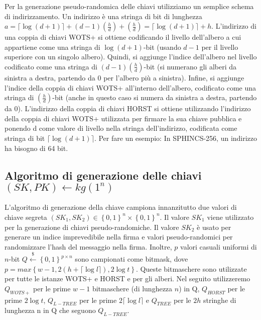 Per la generazione pseudo-randomica delle chiavi utilizziamo un semplice schema di indirizzamento. Un indirizzo è una stringa di bit di lunghezza \(a = \lceil \log(d + 1)\rceil + (d - 1)(\frac{h}{d}) + (\frac{h}{d}) = \lceil \log(d + 1)\rceil + h\). L'indirizzo di una coppia di chiavi WOTS+ si ottiene codificando il livello dell'albero a cui appartiene come una stringa di \(\log(d+1)\)-bit (usando \(d-1\) per il livello superiore con un singolo albero). Quindi, si aggiunge l'indice dell'albero nel livello codificato come una stringa di \((d - 1)(\frac{h}{d})\)-bit (si numerano gli alberi da sinistra a destra, partendo da 0 per l'albero più a sinistra). Infine, si aggiunge l'indice della coppia di chiavi WOTS+ all'interno dell'albero, codificato come una stringa di \((\frac{h}{d})\)-bit (anche in questo caso si numera da sinistra a destra, partendo da 0). L'indirizzo della coppia di chiavi HORST si ottiene utilizzando l'indirizzo della coppia di chiavi WOTS+ utilizzata per firmare la sua chiave pubblica e ponendo d come valore di livello nella stringa dell'indirizzo, codificata come stringa di bit \(\lceil \log(d + 1) \rceil\). Per fare un esempio: In SPHINCS-256, un indirizzo ha bisogno di 64 bit.

\subsection{Algoritmo di generazione delle chiavi\\\((SK, PK) \leftarrow kg(1^n)\)}
\label{sec:key_generation}
L'algoritmo di generazione della chiave campiona innanzitutto due valori di chiave segreta \( (SK_1, SK_2) \in \left\{0,1\right\}^n \times \left\{0,1\right\}^n \). Il valore \(SK_1\) viene utilizzato per la generazione di chiavi pseudo-randomiche. Il valore \(SK_2\) è usato per generare un indice imprevedibile nella firma e valori pseudo-randomici per randomizzare l'hash del messaggio nella firma. Inoltre, \(p\) valori casuali uniformi di \(n\)-bit \(Q \overset{\$}{\leftarrow} \left\{0, 1\right\}^{p \times n}\) sono campionati come bitmask, dove \( p = max\left\{w-1, 2(h + \lceil \log l \rceil), 2 \log t\right\} \). Queste bitmaschere sono utilizzate per tutte le istanze WOTS+ e HORST e per gli alberi. Nel seguito utilizzeremo \(Q_{WOTS+}\) per le prime \(w - 1\) bitmaschere (di lunghezza \(n\)) in Q, \(Q_{HORST}\) per le prime \(2 \log t\), \(Q_{L-TREE}\) per le prime \( 2 \lceil \log l \rceil \) e \(Q_{TREE}\) per le \(2h\) stringhe di lunghezza n in Q che seguono \(Q_{L-TREE}\).


